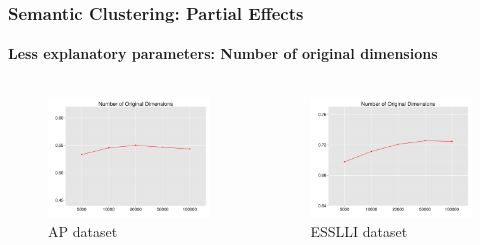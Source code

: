 \documentclass[t]{beamer} %
\begin{document}
\begin{frame}
  \frametitle{Semantic Clustering: Partial Effects}
  \framesubtitle{Less explanatory parameters: Number of original dimensions}

  \vspace{-18pt}

  \begin{columns}
    
    \begin{column}{0.5\textwidth}
      \begin{figure} 
        \hspace*{-18pt} 
        \includegraphics[scale=0.30]{img/lapesa_ap_main_origdim}
        \vspace{-10pt}
        \caption{AP dataset}
      \end{figure}
    \end{column}

    \begin{column}{0.5\textwidth}
      \centering
      
      \begin{figure}
        \hspace*{-18pt}   
        \includegraphics[scale=0.30]{img/lapesa_esslli_main_origdim}
        \vspace{-10pt}
        \caption{ESSLLI dataset}
      \end{figure}
      

\end{column}
\end{columns}
\end{frame}
\end{document}
